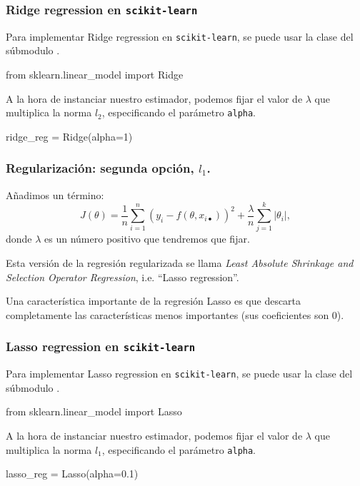 \documentclass{beamer}
\begin{document}
\begin{frame}[fragile]
   \frametitle{Ridge regression en {\tt scikit-learn}}
   \begin{overlayarea}{\textwidth}{\textheight} 
   Para implementar Ridge regression en {\tt scikit-learn}, se puede
   usar la clase  del súbmodulo .
   \begin{pyverbatim}
from sklearn.linear_model import Ridge     
\end{pyverbatim}
\medskip

A la hora de instanciar nuestro estimador, podemos fijar el valor de
$\lambda$ que multiplica la norma $l_2$, especificando el parámetro
{\tt alpha}.
\begin{pyverbatim}
ridge_reg = Ridge(alpha=1)  
\end{pyverbatim}
\end{overlayarea}   
\end{frame}

 \begin{frame}\frametitle{Regularización: segunda opción, $l_1$.}\vspace{-0.3cm}
   \begin{overlayarea}{\textwidth}{\textheight} 
 \begin{block}{}
 Añadimos un término: 
 $$J(\theta)=\frac 1
 n\sum_{i=1}^n\left(y_i-f(\theta,x_{i\bullet})\right)^2 +  \frac
 \lambda n  \sum_{j=1}^{k}\vert \theta_i\vert, $$
 donde $\lambda$ es un número positivo que tendremos que fijar.   
\end{block}
\begin{block}{}
   Esta versión de la regresión regularizada se llama \textit{Least Absolute
   Shrinkage and Selection Operator Regression}, i.e. \alert{``Lasso
   regression''}.
 \end{block}
 Una característica importante de la regresión Lasso es que descarta
 completamente las características menos importantes (sus coeficientes
 son 0).
   \end{overlayarea}
 \end{frame}
\begin{frame}[fragile]
   \frametitle{Lasso regression en {\tt scikit-learn}}
   \begin{overlayarea}{\textwidth}{\textheight} 
   Para implementar Lasso regression en {\tt scikit-learn}, se puede
   usar la clase  del súbmodulo .
   \begin{pyverbatim}
from sklearn.linear_model import Lasso
\end{pyverbatim}

\medskip


A la hora de instanciar nuestro estimador, podemos fijar el valor de
$\lambda$ que multiplica la norma $l_1$, especificando el parámetro
{\tt alpha}.
\begin{pyverbatim}
lasso_reg = Lasso(alpha=0.1)  
\end{pyverbatim}
\end{overlayarea}   
\end{frame}
\end{document}
